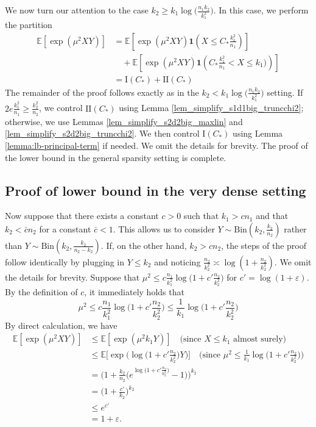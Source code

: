 \documentclass{article}
\newcommand{\EE}{\mathbb{E}}
\newcommand{\one}{\mathbf{1}}
\newcommand{\eps}{\varepsilon} %
\newcommand{\Ct}{C_{*}}
\begin{document}
We now turn our attention to the case $k_2 \geq k_1 \log \big(\frac{n_1k_2}{k_1^2}\big)$. In this case, we perform the partition
\begin{align*}
    \EE[\exp(\mu^2XY)] &= \EE[\exp(\mu^2XY)\one(X \leq \Ct \frac{k_1^2}{n_1})] \\
    &\quad +  \EE[\exp(\mu^2XY)\one(\Ct \frac{k_1^2}{n_1} < X \leq k_1\big))] \\
    &= \text{I}(C_*) + \text{II}(C_*)
\end{align*}
The remainder of the proof follows exactly as in the $k_2 < k_1 \log \big(\frac{n_1k_2}{k_1^2}\big)$ setting. If $2e\frac{k_1^2}{n_1} \geq \frac{k_2^2}{n_2}$, we control $\text{II}(C_*)$ using Lemma \ref{lem_simplify_s1d1big_truncchi2}; otherwise, we use Lemmas \ref{lem_simplify_s2d2big_maxlin} and \ref{lem_simplify_s2d2big_truncchi2}. We then control $\text{I}(C_*)$ using Lemma \ref{lemma:lb-principal-term} if needed. We omit the details for brevity. The proof of the lower bound in the general sparsity setting is complete.
\subsection{Proof of lower bound in the very dense setting}\label{sec_pf_lb_dense}
Now suppose that there exists a constant $c > 0$ such that $k_1 > cn_1$ and that $k_2 < \bar{c}n_2$ for a constant $\bar{c} < 1$. This allows us to consider $Y \sim \text{Bin}(k_2, \frac{k_2}{n_2})$ rather than $Y \sim \text{Bin}(k_2, \frac{k_2}{n_2 - k_2})$. If, on the other hand, $k_2 > cn_2$, the steps of the proof follow identically by plugging in $Y \leq k_2$ and noticing $\frac{n_2}{k_2^2} \asymp \log(1 + \frac{n_2}{k_2^2})$. We omit the details for brevity. Suppose that $\mu^2 \leq c\frac{n_1}{k_1^2}\log\big(1 + c'\frac{n_2}{k_2^2}\big)$ for $c' = \log(1 + \eps)$. By the definition of $c$, it immediately holds that
\[\mu^2 \leq c\frac{n_1}{k_1^2}\log\big(1 + c'\frac{n_2}{k_2^2}\big) \leq \frac{1}{k_1}\log\big(1 + c'\frac{n_2}{k_2^2}\big)\]
By direct calculation, we have
\begin{align*}
    \EE[\exp(\mu^2XY)] &\leq \EE[\exp(\mu^2k_1Y)] \quad \text{(since $X \leq k_1$ almost surely)} \\
    &\leq \EE\Big[\exp\Big(\log\big(1+c'\frac{n_2}{k_2^2}\big)Y\Big)\Big] \quad \text{(since $\mu^2\leq \frac{1}{k_1}\log\big(1 + c'\frac{n_2}{k_2^2}\big)$)} \\
    &= \Big(1 + \frac{k_2}{n_2}\big(e^{\log\big(1 + c'\frac{n_2}{k_2^2}\big)} - 1\big)\Big)^{k_2} \\
    &= \big(1 + \frac{c'}{k_2}\big)^{k_2} \\
    &\leq e^{c'} \\
    &= 1 + \eps.
\end{align*}
\end{document}
